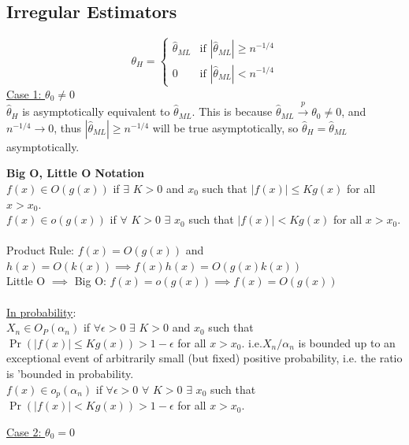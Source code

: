 \documentclass[DIV=14,titlepage=false]{scrreprt}
\begin{document}
\subsection{Irregular Estimators}
\underline{}
\[
\theta_{H}=\begin{cases}
    \hat{\theta}_{ML} & \text{if } |\hat{\theta}_{ML}|\geq n^{-1/4}\\
    0 & \text{if } |\hat{\theta}_{ML}|<n^{-1/4}
\end{cases}
\]
\underline{Case 1: \(\theta_0\neq 0\)}
\\ \(\hat{\theta}_{H}\) is asymptotically equivalent to \(\hat{\theta}_{ML}\).
This is because \(\hat{\theta}_{ML}\xrightarrow{p}\theta_0\neq 0\), and \(n^{-1/4}\rightarrow0\), thus \(|\hat{\theta}_{ML}|\geq n^{-1/4}\) will be true asymptotically, so \(\hat{\theta}_{H}=\hat{\theta}_{ML}\) asymptotically.
\\
\begin{note} \textbf{Big O, Little O Notation}
   \\ \(f(x)\in O(g(x))\) if \(\exists\) \(K>0\) and \(x_0\) such that \(|f(x)|\leq Kg(x)\) for all \(x>x_0\).
   \\ \(f(x)\in o(g(x))\) if \(\forall\) \(K>0\) \(\exists\) \(x_0\) such that \(|f(x)|< Kg(x)\) for all \(x>x_0\).
\\ \\ Product Rule: \(f(x)=O(g(x))\) and \(h(x)=O(k(x))\implies f(x)h(x)=O(g(x)k(x))\)
\\ Little O \(\implies\) Big O: \(f(x)=o(g(x))\implies f(x)=O(g(x))\)
\\ \\ \underline{In probability}:
\\ \(X_n\in O_P(\alpha_n)\) if \(\forall \epsilon>0\) \(\exists\) \(K>0\) and \(x_0\) such that \(\Pr(|f(x)|\leq Kg(x))>1-\epsilon\) for all \(x>x_0\).
    i.e.\(X_n/\alpha_n\) is bounded up to an exceptional event of arbitrarily small (but fixed) positive probability, i.e. the ratio is 'bounded in probability.
\\ \(f(x)\in o_p(\alpha_n)\) if \(\forall \epsilon>0\) \(\forall\) \(K>0\) \(\exists\) \(x_0\) such that \(\Pr(|f(x)|< Kg(x))>1-\epsilon\) for all \(x>x_0\).

\end{note}
\underline{Case 2: \(\theta_0=0\)}
\\ 
\end{document}
